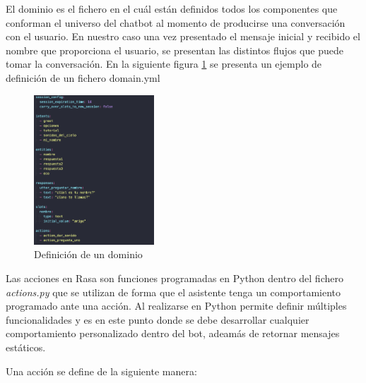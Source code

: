 
El dominio es el fichero en el cuál están definidos todos los componentes que conforman el universo del chatbot al momento de producirse una conversación con el usuario. En nuestro caso una vez presentado el mensaje inicial y recibido el nombre que proporciona el usuario, se presentan las distintos flujos que puede tomar la conversación. En la siguiente figura \ref{fig:rasa_domain} se presenta un ejemplo de definición de un fichero domain.yml

\begin{figure}[H]
    \centering
    \includegraphics[width=0.4\textwidth]{include/capturas/RasaDomain.png}
    \caption{Definición de un dominio}
    \label{fig:rasa_domain}
\end{figure}



Las acciones en Rasa son funciones programadas en Python dentro del fichero \textit{actions.py} que se utilizan de forma que el asistente tenga un comportamiento programado ante una acción. Al realizarse en Python permite definir múltiples funcionalidades y es en este punto donde se debe desarrollar cualquier comportamiento personalizado dentro del bot, adeamás de retornar mensajes estáticos.

Una acción se define de la siguiente manera:


